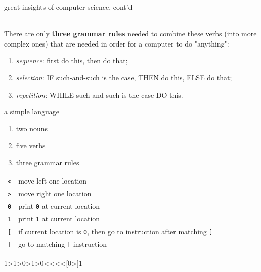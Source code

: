 \documentclass[10pt,t,svgnames]{beamer}
\makeatletter
\newlength\tightleftmargin{}
\newlength\diffleftmargin{}
\providecommand{\nextline}{
  \setlength\labelwidth{\tightleftmargin}
  \setlength\leftmargin{\tightleftmargin}
  \advance\linewidth\diffleftmargin{}
  \advance\@totalleftmargin-\diffleftmargin{}
  \parshape\@ne\@totalleftmargin\linewidth{}
  \setlength\itemsep{1.5ex}
}
\let\origdescription\description
\let\endorigdescription\enddescription
\renewenvironment{description}{\origdescription\nextline}{\endorigdescription}
\makeatother
\begin{document}
  \begin{frame}[c]{great insights of computer science, cont'd}
    \begin{description}
      \item[Boehm and Jacopini] \hfill \\
        There are only \textbf{three grammar rules} needed to combine these
        verbs (into more complex ones) that are needed in order for a computer
        to do "anything":
        \begin{enumerate}
          \item \emph{sequence}: first do this, then do that;
          \item \emph{selection}: IF such-and-such is the case, THEN do this,
            ELSE do that;
          \item \emph{repetition}: WHILE such-and-such is the case DO this.
        \end{enumerate}
    \end{description}
  \end{frame}

  \begin{frame}[fragile]{a simple language}
    \begin{enumerate}
      \item two nouns
      \item five verbs
      \item three grammar rules
    \end{enumerate}
    \vspace{\baselineskip}

    \begin{tabular}{l|l}
      \hline
      \texttt{\textless}    & move left one location\\
      \texttt{\textgreater} & move right one location\\
      \texttt{0}            & print \texttt{0} at current location\\
      \texttt{1}            & print \texttt{1} at current location\\
      \texttt{[}            & if current location is \texttt{0}, then go to
                              instruction after matching \texttt{]}\\
      \texttt{]}            & go to matching \texttt{[} instruction\\
      \hline
    \end{tabular}

    \begin{termblock}
    1>1>0>1>0<<<<[0>]1
    \end{termblock}

  \end{frame}
\end{document}
